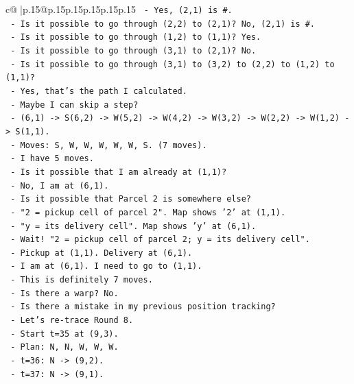 \documentclass{article}
\begin{document}
{\begin{supertabular}{c@{$\;$}|p{.15\linewidth}@{}p{.15\linewidth}p{.15\linewidth}p{.15\linewidth}p{.15\linewidth}p{.15\linewidth}}
{{{\texttt{      {-} Yes, (2,1) is \#.} \\
\texttt{      {-} Is it possible to go through (2,2) to (2,1)? No, (2,1) is \#.} \\
\texttt{      {-} Is it possible to go through (1,2) to (1,1)? Yes.} \\
\texttt{      {-} Is it possible to go through (3,1) to (2,1)? No.} \\
\texttt{      {-} Is it possible to go through (3,1) to (3,2) to (2,2) to (1,2) to (1,1)?} \\
\texttt{      {-} Yes, that's the path I calculated.} \\
\texttt{      {-} Maybe I can skip a step?} \\
\texttt{      {-} (6,1) {-}> S(6,2) {-}> W(5,2) {-}> W(4,2) {-}> W(3,2) {-}> W(2,2) {-}> W(1,2) {-}> S(1,1).} \\
\texttt{      {-} Moves: S, W, W, W, W, W, S. (7 moves).} \\
\texttt{      {-} I have 5 moves.} \\
\texttt{      {-} Is it possible that I am already at (1,1)?} \\
\texttt{      {-} No, I am at (6,1).} \\
\texttt{      {-} Is it possible that Parcel 2 is somewhere else?} \\
\texttt{      {-} "2 = pickup cell of parcel 2". Map shows '2' at (1,1).} \\
\texttt{      {-} "y = its delivery cell". Map shows 'y' at (6,1).} \\
\texttt{      {-} Wait! "2 = pickup cell of parcel 2; y = its delivery cell".} \\
\texttt{      {-} Pickup at (1,1). Delivery at (6,1).} \\
\texttt{      {-} I am at (6,1). I need to go to (1,1).} \\
\texttt{      {-} This is definitely 7 moves.} \\
\texttt{      {-} Is there a warp? No.} \\
\texttt{      {-} Is there a mistake in my previous position tracking?} \\
\texttt{      {-} Let's re{-}trace Round 8.} \\
\texttt{      {-} Start t=35 at (9,3).} \\
\texttt{      {-} Plan: N, N, W, W, W.} \\
\texttt{      {-} t=36: N {-}> (9,2).} \\
\texttt{      {-} t=37: N {-}> (9,1).} \\
}}}
\end{supertabular}}
\end{document}
